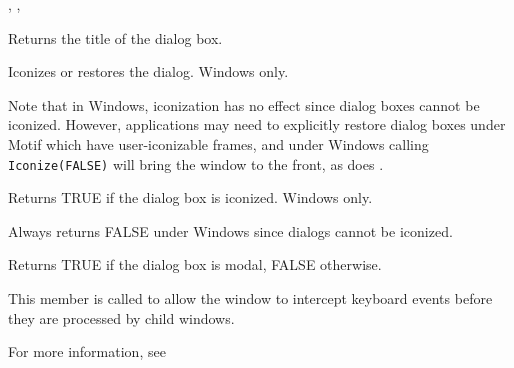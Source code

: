 
, ,\rtfsp
{}

\label{wxdialoggettitle}


Returns the title of the dialog box.

\label{wxdialogiconized}


Iconizes or restores the dialog. Windows only.




Note that in Windows, iconization has no effect since dialog boxes cannot be
iconized. However, applications may need to explicitly restore dialog
boxes under Motif which have user-iconizable frames, and under Windows
calling {\tt Iconize(FALSE)} will bring the window to the front, as does
.

\label{wxdialogisiconized}


Returns TRUE if the dialog box is iconized. Windows only.


Always returns FALSE under Windows since dialogs cannot be iconized.

\label{wxdialogismodal}


Returns TRUE if the dialog box is modal, FALSE otherwise.

\label{wxdialogoncharhook}


This member is called to allow the window to intercept keyboard events
before they are processed by child windows.

For more information, see 

